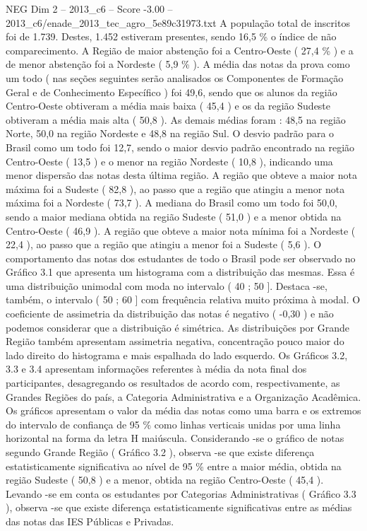 \begin{textsample}{NEG Dim 2 – 2013\_c6 – Score -3.00 – 2013\_c6/enade\_2013\_tec\_agro\_5e89c31973.txt}
A população total de inscritos foi de 1.739.
Destes, 1.452 estiveram presentes, sendo 16,5 \% o índice de não comparecimento.
A Região de maior abstenção foi a Centro-Oeste ( 27,4 \% ) e a de menor abstenção foi a Nordeste ( 5,9 \% ).
A média das notas da prova como um todo ( nas seções seguintes serão analisados os Componentes de Formação Geral e de Conhecimento Específico ) foi 49,6, sendo que os alunos da região Centro-Oeste obtiveram a média mais baixa ( 45,4 ) e os da região Sudeste obtiveram a média mais alta ( 50,8 ).
As demais médias foram : 48,5 na região Norte, 50,0 na região Nordeste e 48,8 na região Sul.
O desvio padrão para o Brasil como um todo foi 12,7, sendo o maior desvio padrão encontrado na região Centro-Oeste ( 13,5 ) e o menor na região Nordeste ( 10,8 ), indicando uma menor dispersão das notas desta última região.
A região que obteve a maior nota máxima foi a Sudeste ( 82,8 ), ao passo que a região que atingiu a menor nota máxima foi a Nordeste ( 73,7 ).
A mediana do Brasil como um todo foi 50,0, sendo a maior mediana obtida na região Sudeste ( 51,0 ) e a menor obtida na Centro-Oeste ( 46,9 ).
A região que obteve a maior nota mínima foi a Nordeste ( 22,4 ), ao passo que a região que atingiu a menor foi a Sudeste ( 5,6 ).
O comportamento das notas dos estudantes de todo o Brasil pode ser observado no Gráfico 3.1 que apresenta um histograma com a distribuição das mesmas.
Essa é uma distribuição unimodal com moda no intervalo ( 40 ; 50 ].
Destaca -se, também, o intervalo ( 50 ; 60 ] com frequência relativa muito próxima à modal.
O coeficiente de assimetria da distribuição das notas é negativo ( -0,30 ) e não podemos considerar que a distribuição é simétrica.
As distribuições por Grande Região também apresentam assimetria negativa, concentração pouco maior do lado direito do histograma e mais espalhada do lado esquerdo.
Os Gráficos 3.2, 3.3 e 3.4 apresentam informações referentes à média da nota final dos participantes, desagregando os resultados de acordo com, respectivamente, as Grandes Regiões do país, a Categoria Administrativa e a Organização Acadêmica.
Os gráficos apresentam o valor da média das notas como uma barra e os extremos do intervalo de confiança de 95 \% como linhas verticais unidas por uma linha horizontal na forma da letra H maiúscula.
Considerando -se o gráfico de notas segundo Grande Região ( Gráfico 3.2 ), observa -se que existe diferença estatisticamente significativa ao nível de 95 \% entre a maior média, obtida na região Sudeste ( 50,8 ) e a menor, obtida na região Centro-Oeste ( 45,4 ).
Levando -se em conta os estudantes por Categorias Administrativas ( Gráfico 3.3 ), observa -se que existe diferença estatisticamente significativas entre as médias das notas das IES Públicas e Privadas.

\end{textsample}
